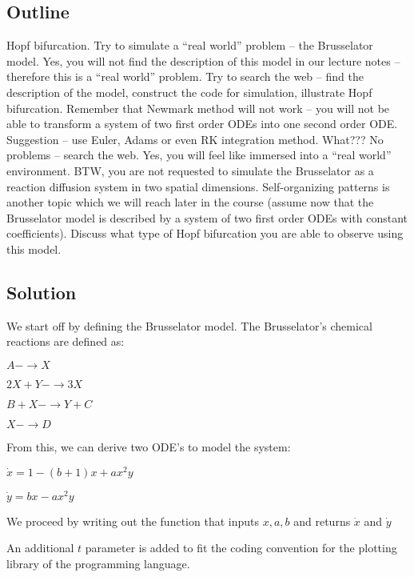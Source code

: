 \documentclass[11pt]{article}
\begin{document}
\hypertarget{outline}{%
\subsection{Outline}\label{outline}}

Hopf bifurcation. Try to simulate a ``real world'' problem -- the
Brusselator model. Yes, you will not find the description of this model
in our lecture notes -- therefore this is a ``real world'' problem. Try
to search the web -- find the description of the model, construct the
code for simulation, illustrate Hopf bifurcation. Remember that Newmark
method will not work -- you will not be able to transform a system of
two first order ODEs into one second order ODE. Suggestion -- use Euler,
Adams or even RK integration method. What??? No problems -- search the
web. Yes, you will feel like immersed into a ``real world'' environment.
BTW, you are not requested to simulate the Brusselator as a reaction
diffusion system in two spatial dimensions. Self-organizing patterns is
another topic which we will reach later in the course (assume now that
the Brusselator model is described by a system of two first order ODEs
with constant coefficients). Discuss what type of Hopf bifurcation you
are able to observe using this model.

    \hypertarget{solution}{%
\subsection{Solution}\label{solution}}

We start off by defining the Brusselator model. The Brusselator's
chemical reactions are defined as:

\(A −→ X\)

\(2X + Y −→ 3X\)

\(B + X −→ Y + C\)

\(X −→ D\)

From this, we can derive two ODE's to model the system:

\(\dot{x} = 1 − (b + 1)x + ax^2y\)

\(\dot{y} = bx − ax^2y\)

We proceed by writing out the function that inputs \(x,a,b\) and returns
\(\dot{x}\) and \(\dot{y}\)

An additional \(t\) parameter is added to fit the coding convention for
the plotting library of the programming language.
\end{document}
